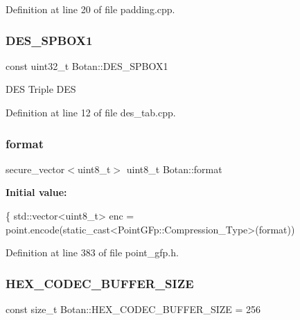 Definition at line 20 of file padding.\+cpp.

\mbox{\label{namespace_botan_ad1f2122e900d9b65e6c949734915b67b}} 
\subsubsection{\texorpdfstring{D\+E\+S\+\_\+\+S\+P\+B\+O\+X1}{DES\_SPBOX1}}
{\footnotesize\ttfamily const uint32\+\_\+t Botan\+::\+D\+E\+S\+\_\+\+S\+P\+B\+O\+X1}

D\+ES Triple D\+ES 

Definition at line 12 of file des\+\_\+tab.\+cpp.

\mbox{\label{namespace_botan_a84160e8d4f120a4f232bf20ecb80be0e}} 
\subsubsection{\texorpdfstring{format}{format}}
{\footnotesize\ttfamily secure\+\_\+vector$<$uint8\+\_\+t$>$ uint8\+\_\+t Botan\+::format}

{\bfseries Initial value\+:}
\begin{DoxyCode}
\{
   std::vector<uint8\_t> enc = point.encode(static\_cast<PointGFp::Compression\_Type>(format))
\end{DoxyCode}


Definition at line 383 of file point\+\_\+gfp.\+h.

\mbox{\label{namespace_botan_a74718b9df0b68e9b2d04755c39d3b55d}} 
\subsubsection{\texorpdfstring{H\+E\+X\+\_\+\+C\+O\+D\+E\+C\+\_\+\+B\+U\+F\+F\+E\+R\+\_\+\+S\+I\+ZE}{HEX\_CODEC\_BUFFER\_SIZE}}
{\footnotesize\ttfamily const size\+\_\+t Botan\+::\+H\+E\+X\+\_\+\+C\+O\+D\+E\+C\+\_\+\+B\+U\+F\+F\+E\+R\+\_\+\+S\+I\+ZE = 256}

